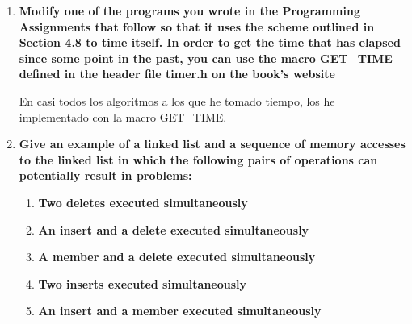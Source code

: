 \documentclass[a4paper,12pt]{article}
\begin{document}
\begin{enumerate}
El código es el siguiente:

\begin{lstlisting}
#include <stdio.h>
#include <pthread.h>
#include <string.h>
#include <stdlib.h>

pthread_barrier_t barrier;

void * fun(void * arg){
	int rank = *((int*)arg);
	pthread_barrier_wait(&barrier);
	printf("MY->%d\n", rank);
	return NULL;
}

int main(int argv, char ** argc){
	if(argv != 2){
		printf("Faltan argumentos <numThreads>\n");
		return 0;
	}
	int numThreads = atoi(argc[1]);
	pthread_t threads[numThreads];
	int threads_args[numThreads];
	pthread_barrier_init(&barrier,NULL,numThreads);
	for(int i = 0; i < numThreads; i++){
		threads_args[i] = i;
		pthread_create(&threads[i],NULL,fun,(void*) &threads_args[i]);
	}
	for(int i = 0; i< numThreads; i++){
		pthread_join(threads[i],NULL);
	}
}
\end{lstlisting}


\item \textbf{Modify one of the programs you wrote in the Programming Assignments that follow so that it uses the scheme
outlined in Section 4.8 to time itself. In order to get the time that has elapsed since some point in the past, you can use
the macro GET\_TIME defined in the header file timer.h on the book’s website}
 
En casi todos los algoritmos a los que he tomado tiempo, los he implementado con la macro GET\_TIME.

\item{ \textbf{Give an example of a linked list and a sequence of memory accesses to the linked list in which the
following pairs of operations can potentially result in problems:}
\begin{enumerate}
 \item \textbf{Two deletes executed simultaneously}
 \item \textbf{An insert and a delete executed simultaneously}
 \item \textbf{A member and a delete executed simultaneously}
 \item \textbf{Two inserts executed simultaneously}
 \item \textbf{An insert and a member executed simultaneously}
\end{enumerate}
}


\end{enumerate}
\end{document}
